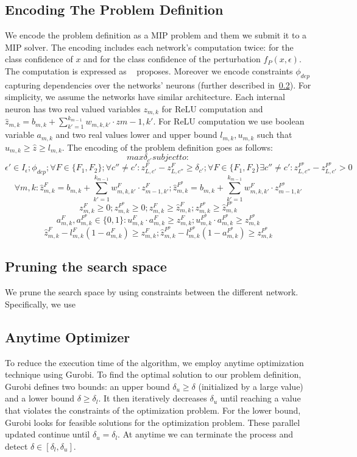 \subsection{Encoding The Problem Definition}
We encode the problem definition as a MIP problem and them we submit it to a MIP solver. The encoding includes each network's computation twice: for the class confidence of $x$ and for the class confidence of the perturbation $f_P(x,\epsilon)$. The computation is expressed as ~\cite{MIPVERIFY} proposes. Moreover we encode constraints $\phi_{dep}$ capturing dependencies over the networks’ neurons (further described in~\ref{PRUNESUBSECTION}). For simplicity, we assume the networks have similar architecture. Each internal neuron has two real valued variables $z_{m,k}$  for ReLU computation and $\hat{z}_{m,k}=b_{m,k}+\sum_{k'=1}^{k_{m-1}} w_{m,k,k'}\cdot{z{m-1,k'}}$. For ReLU computation we use boolean variable $a_{m,k}$ and two real values lower and upper bound $l_{m,k},u_{m,k}$ such that $u_{m,k}\geq{\hat{z}}\geq{l_{m,k}}$.
The encoding of the problem definition goes as follows:
$$max{\delta_{c'}} subject to:$$
$$ \epsilon'\in{I_\epsilon}; \phi_{dep}; \forall{F}\in{\{F_1,F_2\}}; \forall{c''}\neq{c'}: z^{F}_{L,c'}-z^{F}_{L,c''}\geq\delta_{c'}; \forall{F}\in{\{F_1,F_2\}}\exists{c''}\neq{c'}: z^{F^p}_{L,c''}-z^{F^p}_{L,c'}>0$$
$$\forall{m,k}: \hat{z}^F_{m,k}=b_{m,k}+\sum_{k'=1}^{k_{m-1}} w^F_{m,k,k'}\cdot{z^F_{m-1,k'}}; \hat{z}^{F^p}_{m,k}=b_{m,k}+\sum_{k'=1}^{k_{m-1}} w^F_{m,k,k'}\cdot{z^{F^p}_{m-1,k'}}$$
$$z^F_{m,k}\geq0; z^{F^p}_{m,k}\geq0; z^F_{m,k}\geq{\hat{z}^F_{m,k}}; z^{F^p}_{m,k}\geq{\hat{z}^{F^p}_{m,k}}$$
$$a^F_{m,k},a^{F^p}_{m,k}\in{\{0,1\}}: u^F_{m,k}\cdot{a^F_{m,k}}\geq{z^F_{m,k}}; u^{F^p}_{m,k}\cdot{a^{F^p}_{m,k}}\geq{z^{F^p}_{m,k}}$$
$$\hat{z}^F_{m,k}-l^F_{m,k}(1-a^F_{m,k})\geq{z^F_{m,k}}; \hat{z}^{F^p}_{m,k}-l^{F^p}_{m,k}(1-a^{F^p}_{m,k})\geq{z^{F^p}_{m,k}}$$


\subsection{Pruning the search space}\label{PRUNESUBSECTION}
We prune the search space by using constraints between the different network. Specifically, we use 


\subsection{Anytime Optimizer}
To reduce the execution time of the algorithm, we employ anytime optimization technique using Gurobi. To find the optimal solution to our problem definition, Gurobi defines two bounds: an upper bound $\delta_u\geq\delta$ (initialized by a large value) and a lower bound $\delta\geq\delta_l$. It then iteratively decreases $\delta_u$ until reaching a value that violates the constraints of the optimization problem. For the lower bound, Gurobi looks for feasible solutions for the optimization problem. These parallel updated continue until $\delta_u=\delta_l$. At anytime we can terminate the process and detect $\delta\in[\delta_l,\delta_u]$. 